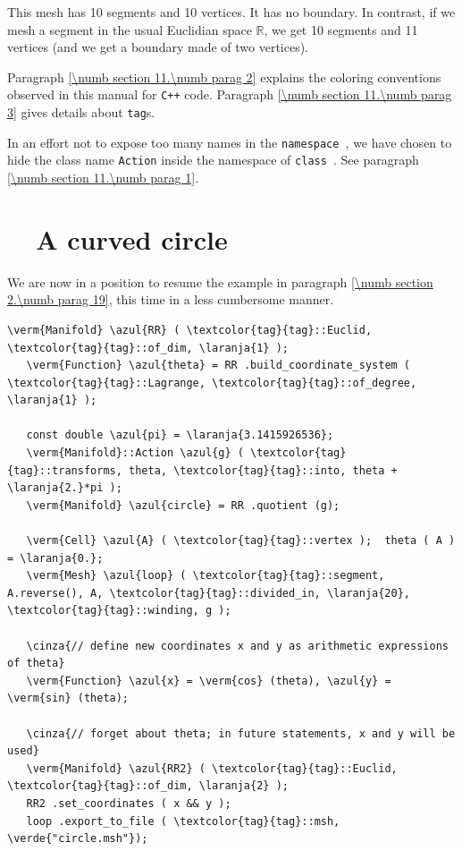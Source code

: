 This mesh has 10 segments and 10 vertices. It has no boundary.
In contrast, if we mesh a segment in the usual Euclidian space $ \mathbb{R} $,
we get 10 segments and 11 vertices (and we get a boundary made of two vertices).

Paragraph \ref{\numb section 11.\numb parag 2} explains the coloring conventions observed
in this manual for {\tt C++} code.
Paragraph \ref{\numb section 11.\numb parag 3} gives details about
{\small\tt\textcolor{tag}{tag}}s.

In an effort not to expose too many names in the {\small\tt namespace },
we have chosen to hide the class name {\small\tt Action} inside the namespace of
{\small\tt class }.
See paragraph \ref{\numb section 11.\numb parag 1}.


\section{~~A curved circle}\label{\numb section 7.\numb parag 2}

We are now in a position to resume the example in paragraph \ref{\numb section 2.\numb parag 19},
this time in a less cumbersome manner.

\begin{Verbatim}[commandchars=\\\{\},formatcom=\small\tt,frame=single,
   label=parag-\ref{\numb section 7.\numb parag 2}.cpp,rulecolor=\color{moldura},
   baselinestretch=0.94,framesep=2mm                                            ]
   \verm{Manifold} \azul{RR} ( \textcolor{tag}{tag}::Euclid, \textcolor{tag}{tag}::of_dim, \laranja{1} );
   \verm{Function} \azul{theta} = RR .build_coordinate_system ( \textcolor{tag}{tag}::Lagrange, \textcolor{tag}{tag}::of_degree, \laranja{1} );

   const double \azul{pi} = \laranja{3.1415926536};
   \verm{Manifold}::Action \azul{g} ( \textcolor{tag}{tag}::transforms, theta, \textcolor{tag}{tag}::into, theta + \laranja{2.}*pi );
   \verm{Manifold} \azul{circle} = RR .quotient (g);

   \verm{Cell} \azul{A} ( \textcolor{tag}{tag}::vertex );  theta ( A ) = \laranja{0.};
   \verm{Mesh} \azul{loop} ( \textcolor{tag}{tag}::segment, A.reverse(), A, \textcolor{tag}{tag}::divided_in, \laranja{20}, \textcolor{tag}{tag}::winding, g );

   \cinza{// define new coordinates x and y as arithmetic expressions of theta}
   \verm{Function} \azul{x} = \verm{cos} (theta), \azul{y} = \verm{sin} (theta);

   \cinza{// forget about theta; in future statements, x and y will be used}
   \verm{Manifold} \azul{RR2} ( \textcolor{tag}{tag}::Euclid, \textcolor{tag}{tag}::of_dim, \laranja{2} );
   RR2 .set_coordinates ( x && y );
   loop .export_to_file ( \textcolor{tag}{tag}::msh, \verde{"circle.msh"});
\end{Verbatim}

